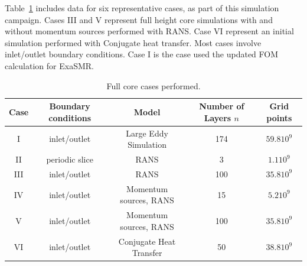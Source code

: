 Table~\ref{tab:full core} includes data for six representative cases, as part of this simulation campaign. Cases III and V represent full height core simulations with and without momentum sources performed with RANS. Case VI represent an initial simulation performed with Conjugate heat transfer. Most cases involve inlet/outlet boundary conditions. Case I is the case used the updated FOM calculation for ExaSMR.

\begin{table} \centering \small
 \begin{tabular}{ccccc} \hline \hline
  Case & Boundary conditions & Model & Number of Layers $n$ & Grid points \\ \hline
   I & inlet/outlet & Large Eddy Simulation & 174 & $59.8 10^{9}$ \\
   II & periodic slice & RANS & 3 & $1.1 10^{9}$ \\
   III & inlet/outlet & RANS & 100 & $35.8 10^{9}$ \\
   IV & inlet/outlet & Momentum sources, RANS & 15 & $5.2 10^{9}$ \\
   V & inlet/outlet & Momentum sources, RANS & 100 & $35.8 10^{9}$ \\
   VI & inlet/outlet & Conjugate Heat Transfer & 50 & $38.8 10^{9}$ \\
   \hline \hline
\end{tabular}
 \caption{Full core cases performed.}
 \label{tab:full core}
\end{table}
